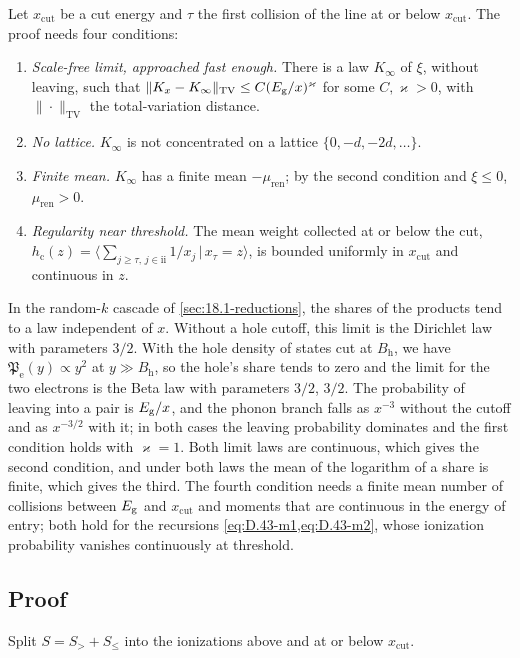 Let $x_{\mathrm{cut}}$ be a cut energy and $\tau$ the first collision of the line at or below $x_{\mathrm{cut}}$. The proof needs four conditions:
\begin{enumerate}
  \item \emph{Scale-free limit, approached fast enough.} There is a law $K_\infty$ of $\xi$, without leaving, such that $\|K_x - K_\infty\|_{\mathrm{TV}} \le C(E_{\mathrm{g}}/x)^\varkappa$ for some $C, \varkappa > 0$, with $\|\cdot\|_{\mathrm{TV}}$ the total-variation distance.
  \item \emph{No lattice.} $K_\infty$ is not concentrated on a lattice $\{0, -d, -2d, \dots\}$.
  \item \emph{Finite mean.} $K_\infty$ has a finite mean $-\mu_{\mathrm{ren}}$; by the second condition and $\xi \le 0$, $\mu_{\mathrm{ren}} > 0$.
  \item \emph{Regularity near threshold.} The mean weight collected at or below the cut, $h_{\mathrm{c}}(z) = \langle\sum_{j \ge \tau,\,j\in\mathrm{ii}}1/x_j\,|\,x_\tau = z\rangle$, is bounded uniformly in $x_{\mathrm{cut}}$ and continuous in $z$.
\end{enumerate}
In the random-$k$ cascade of \cref{sec:18.1-reductions}, the shares of the products tend to a law independent of $x$. Without a hole cutoff, this limit is the Dirichlet law with parameters $3/2$. With the hole density of states cut at $B_{\mathrm{h}}$, we have $\mathfrak{P}_{\mathrm{e}}(y) \propto y^2$ at $y \gg B_{\mathrm{h}}$, so the hole's share tends to zero and the limit for the two electrons is the Beta law with parameters $3/2$, $3/2$. The probability of leaving into a pair is $E_{\mathrm{g}}/x$, and the phonon branch falls as $x^{-3}$ without the cutoff and as $x^{-3/2}$ with it; in both cases the leaving probability dominates and the first condition holds with $\varkappa = 1$. Both limit laws are continuous, which gives the second condition, and under both laws the mean of the logarithm of a share is finite, which gives the third. The fourth condition needs a finite mean number of collisions between $E_{\mathrm{g}}$ and $x_{\mathrm{cut}}$ and moments that are continuous in the energy of entry; both hold for the recursions \cref{eq:D.43-m1,eq:D.43-m2}, whose ionization probability vanishes continuously at threshold.

\subsection{Proof}

Split $S = S_> + S_\le$ into the ionizations above and at or below $x_{\mathrm{cut}}$.

